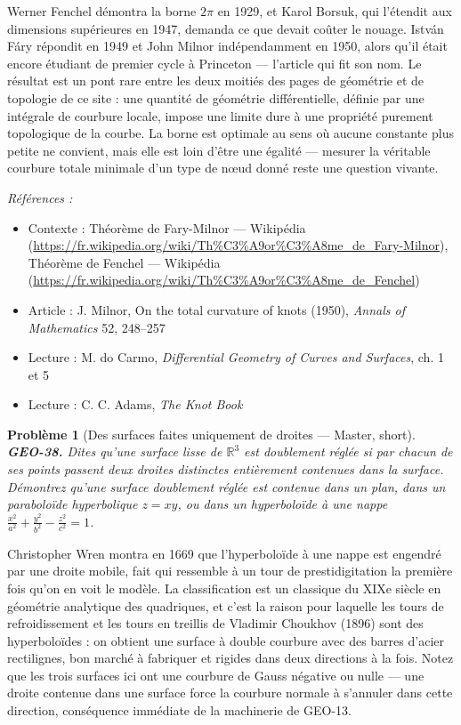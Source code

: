 \documentclass[11pt]{article}
\newtheorem{problem}{Problème}
\newenvironment{refs}{\par\small\noindent\emph{Références :}\begin{itemize}\setlength\itemsep{0pt}}{\end{itemize}\normalsize}
\begin{document}
\noindent Werner Fenchel démontra la borne $ 2\pi $ en 1929, et Karol Borsuk, qui
l'étendit aux dimensions supérieures en 1947, demanda ce que devait coûter le nouage. István Fáry
répondit en 1949 et John Milnor indépendamment en 1950, alors qu'il était encore étudiant de
premier cycle à Princeton --- l'article qui fit son nom. Le résultat est un pont rare entre les deux
moitiés des pages de géométrie et de topologie de ce site : une quantité de géométrie
différentielle, définie par une intégrale de courbure locale, impose une limite dure à une
propriété purement topologique de la courbe. La borne est optimale au sens où aucune constante plus
petite ne convient, mais elle est loin d'être une égalité --- mesurer la véritable courbure totale
minimale d'un type de n\oe{}ud donné reste une question vivante.

\begin{refs}
\item Contexte : Théorème de Fary-Milnor --- Wikipédia (\url{https://fr.wikipedia.org/wiki/Th%C3%A9or%C3%A8me_de_Fary-Milnor}), Théorème de Fenchel --- Wikipédia (\url{https://fr.wikipedia.org/wiki/Th%C3%A9or%C3%A8me_de_Fenchel})
\item Article : J. Milnor, \og{} On the total curvature of knots \fg{} (1950), \textit{Annals of Mathematics} 52, 248--257
\item Lecture : M. do Carmo, \textit{Differential Geometry of Curves and Surfaces}, ch. 1 et 5
\item Lecture : C. C. Adams, \textit{The Knot Book}
\end{refs}

\bigskip

\begin{problem}[{Des surfaces faites uniquement de droites --- Master, short}]
\textbf{GEO-38.} Dites qu'une surface lisse de $ \mathbb{R}^3 $ est
\textit{doublement réglée} si par chacun de ses points passent deux droites distinctes entièrement
contenues dans la surface. Démontrez qu'une surface doublement réglée est contenue dans un plan,
dans un paraboloïde hyperbolique $ z = xy $, ou dans un hyperboloïde à une nappe
$ \frac{x^2}{a^2} + \frac{y^2}{b^2} - \frac{z^2}{c^2} = 1 $.
\end{problem}

\noindent Christopher Wren montra en 1669 que l'hyperboloïde à une nappe est engendré par
une droite mobile, fait qui ressemble à un tour de prestidigitation la première fois qu'on en voit
le modèle. La classification est un classique du XIXe siècle en géométrie analytique des
quadriques, et c'est la raison pour laquelle les tours de refroidissement et les tours en treillis
de Vladimir Choukhov (1896) sont des hyperboloïdes : on obtient une surface à double courbure avec
des barres d'acier rectilignes, bon marché à fabriquer et rigides dans deux directions à la fois.
Notez que les trois surfaces ici ont une courbure de Gauss négative ou nulle --- une droite contenue
dans une surface force la courbure normale à s'annuler dans cette direction, conséquence immédiate
de la machinerie de GEO-13.
\end{document}
